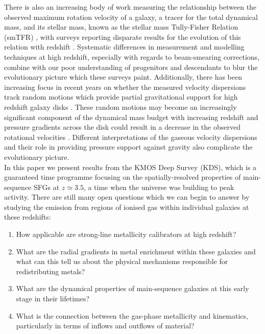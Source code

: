 \documentclass[fleqn,usenatbib]{mn2e}
\begin{document}
There is also an increasing body of work measuring the relationship between the observed maximum rotation velocity of a galaxy, a tracer for the total dynamical mass, and its stellar mass, known as the stellar mass Tully-Fisher Relation (smTFR) \citep{Tully1977}, with surveys reporting disparate results for the evolution of this relation with redshift \citep[e.g.][]{Puech2008,Miller2011,Gnerucci2011,Swinbank2012,Simons2016,Tiley2016a,Harrison2017,Straatman2017,Ubler2017}.
Systematic differences in measurement and modelling techniques at high redshift, especially with regards to beam-smearing corrections, combine with our poor understanding of progenitors and descendants to blur the evolutionary picture which these surveys paint.
Additionally, there has been increasing focus in recent years on whether the measured velocity dispersions track random motions which provide partial gravitational support for high redshift galaxy disks \citep[e.g.][]{Burkert2010,Wuyts2016b,Ubler2017,Genzel2017,Lang2017}.
These random motions may become an increasingly significant component of the dynamical mass budget with increasing redshift \citep{Wuyts2016b} and pressure gradients across the disk could result in a decrease in the observed rotational velocities \citep{Burkert2010}. 
Different interpretations of the gaseous velocity dispersions and their role in providing pressure support against gravity also complicate the evolutionary picture. \\

In this paper we present results from the KMOS Deep Survey (KDS), which is a guaranteed time programme focusing on the spatially-resolved properties of main-sequence SFGs at $z\simeq3.5$, a time when the universe was building to peak activity.
There are still many open questions which we can begin to answer by studying the emission from regions of ionised gas within individual galaxies at these redshifts: \begin{enumerate}[label=(\roman*)] \item How applicable are strong-line metallicity calibrators at high redshift? \item  What are the radial gradients in metal enrichment within these galaxies and what can this tell us about the physical mechanisms responsible for redistributing metals?
\item What are the dynamical properties of main-sequence galaxies at this early stage in their lifetimes? 
\item What is the connection between the gas-phase metallicity and  kinematics, particularly in terms of inflows and outflows of material? \end{enumerate}
\end{document}
